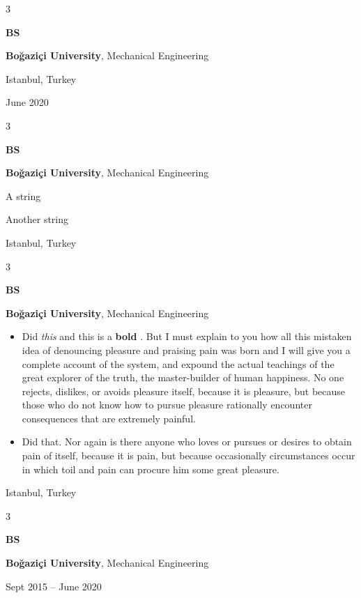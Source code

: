 \documentclass[10pt, letterpaper]{article}
\newenvironment{summary}{
    \begin{description}[
        topsep=0.10 cm,
        parsep=0.10 cm,
        partopsep=0pt,
        itemsep=0pt,
        leftmargin=0.4 cm + 10pt
    ]
}{
    \end{description}
} %
\newenvironment{highlights}{
    \begin{itemize}[
        topsep=0.10 cm,
        parsep=0.10 cm,
        partopsep=0pt,
        itemsep=0pt,
        leftmargin=0.4 cm + 10pt
    ]
}{
    \end{itemize}
} %
\newenvironment{threecolentry}[3][]{
    \onecolentry
    \def\thirdColumn{#3}
    \setcolumnwidth{1 cm, \fill, 4.5 cm}
    \begin{paracol}{3}
    {\raggedright #2} \switchcolumn
}{
    \switchcolumn \raggedleft \thirdColumn
    \end{paracol}
    \endonecolentry
} %
\let\hrefWithoutArrow\href
\renewcommand{\href}[2]{\hrefWithoutArrow{#1}{\ifthenelse{\equal{#2}{}}{ }{#2 }\raisebox{.15ex}{\footnotesize \faExternalLink*}}}
\begin{document}
        \begin{threecolentry}{\textbf{BS}}{
            Istanbul, Turkey

        June 2020
        }
            \textbf{Boğaziçi University}, Mechanical Engineering
        \end{threecolentry}

        \vspace{0.2 cm}

        \begin{threecolentry}{\textbf{BS}}{
            Istanbul, Turkey
        }
            \textbf{Boğaziçi University}, Mechanical Engineering
            \begin{summary}
                \item A string
                \item Another string
            \end{summary}
        \end{threecolentry}

        \vspace{0.2 cm}

        \begin{threecolentry}{\textbf{BS}}{
            Istanbul, Turkey
        }
            \textbf{Boğaziçi University}, Mechanical Engineering
            \begin{highlights}
                \item Did \textit{this} and this is a \textbf{bold} \href{https://example.com}{link}. But I must explain to you how all this mistaken idea of denouncing pleasure and praising pain was born and I will give you a complete account of the system, and expound the actual teachings of the great explorer of the truth, the master-builder of human happiness. No one rejects, dislikes, or avoids pleasure itself, because it is pleasure, but because those who do not know how to pursue pleasure rationally encounter consequences that are extremely painful.
                \item Did that. Nor again is there anyone who loves or pursues or desires to obtain pain of itself, because it is pain, but because occasionally circumstances occur in which toil and pain can procure him some great pleasure.
            \end{highlights}
        \end{threecolentry}

        \vspace{0.2 cm}

        \begin{threecolentry}{\textbf{BS}}{
            Sept 2015 – June 2020
        }
            \textbf{Boğaziçi University}, Mechanical Engineering
        \end{threecolentry}
\end{document}

